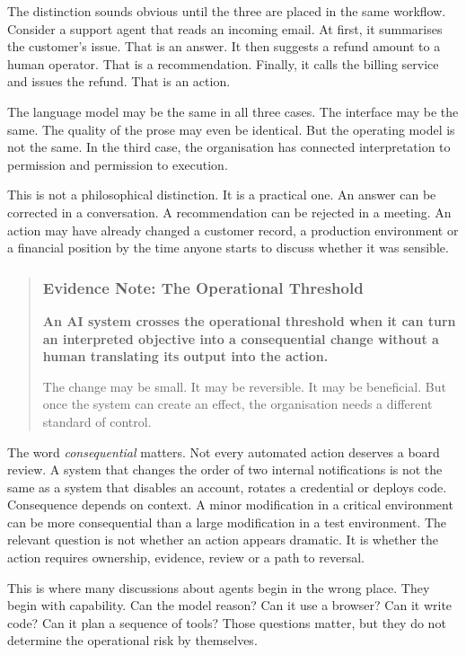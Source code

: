 The distinction sounds obvious until the three are placed in the same
workflow. Consider a support agent that reads an incoming email. At
first, it summarises the customer's issue. That is an answer. It then
suggests a refund amount to a human operator. That is a recommendation.
Finally, it calls the billing service and issues the refund. That is an
action.

The language model may be the same in all three cases. The interface may
be the same. The quality of the prose may even be identical. But the
operating model is not the same. In the third case, the organisation has
connected interpretation to permission and permission to execution.

This is not a philosophical distinction. It is a practical one. An
answer can be corrected in a conversation. A recommendation can be
rejected in a meeting. An action may have already changed a customer
record, a production environment or a financial position by the time
anyone starts to discuss whether it was sensible.

\begin{quote}
\subsubsection{Evidence Note: The Operational
Threshold}\label{evidence-note-the-operational-threshold}

\textbf{An AI system crosses the operational threshold when it can turn
an interpreted objective into a consequential change without a human
translating its output into the action.}

The change may be small. It may be reversible. It may be beneficial. But
once the system can create an effect, the organisation needs a different
standard of control.
\end{quote}

The word \emph{consequential} matters. Not every automated action
deserves a board review. A system that changes the order of two internal
notifications is not the same as a system that disables an account,
rotates a credential or deploys code. Consequence depends on context. A
minor modification in a critical environment can be more consequential
than a large modification in a test environment. The relevant question
is not whether an action appears dramatic. It is whether the action
requires ownership, evidence, review or a path to reversal.

This is where many discussions about agents begin in the wrong place.
They begin with capability. Can the model reason? Can it use a browser?
Can it write code? Can it plan a sequence of tools? Those questions
matter, but they do not determine the operational risk by themselves.

